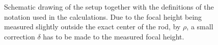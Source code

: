 \documentclass[11pt, a4paper, twocolumn, swedish, english]{article}
\begin{document}
\begin{figure}\centering
\resizebox{.6\linewidth}{!}{}
\caption{Schematic drawing of the setup together with the definitions
  of the notation used in the calculations. Due to the focal height
  being measured slightly outside the exact center of the rod, by
  $\rho$, a small correction $\delta$ has to be made to the measured
  focal height.} 
\label{fig:rot_bowl} 
\end{figure}

\end{document}
